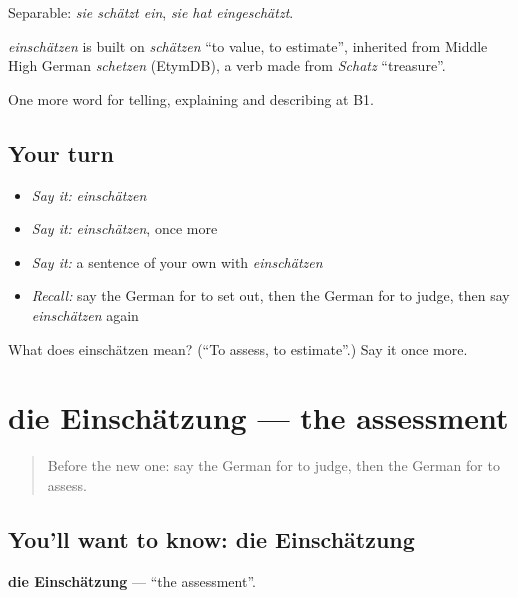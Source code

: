 Separable: \emph{sie schätzt ein}, \emph{sie hat eingeschätzt}.

\begin{cousinweb}
\emph{einschätzen} is built on \emph{schätzen} \textquotedblleft{}to value, to estimate\textquotedblright{}, inherited from Middle High German \emph{schetzen} (EtymDB), a verb made from \emph{Schatz} \textquotedblleft{}treasure\textquotedblright{}.
\end{cousinweb}

\begin{grammarlens}[title={What you've built}]
One more word for telling, explaining and describing at B1.
\end{grammarlens}

\subsection*{Your turn}
\begin{itemize}
\raggedright
  \item \emph{Say it:} \emph{einschätzen}
  \item \emph{Say it:} \emph{einschätzen}, once more
  \item \emph{Say it:} a sentence of your own with \emph{einschätzen}
  \item \emph{Recall:} say the German for to set out, then the German for to judge, then say \emph{einschätzen} again
\end{itemize}

\begin{tcolorbox}[breakable,colback=teal!4,colframe=teal!35!black,title={Before you move on}]
What does einschätzen mean? (\textquotedblleft{}To assess, to estimate\textquotedblright{}.) Say it once more.
\end{tcolorbox}
\section[die Einschätzung]{die Einschätzung — the assessment}

\label{lesson:GE-C340-einschaetzung}



\begin{quote}
Before the new one: say the German for to judge, then the German for to assess.
\end{quote}

\subsection*{You'll want to know: die Einschätzung}
\textbf{die Einschätzung} — \textquotedblleft{}the assessment\textquotedblright{}.

